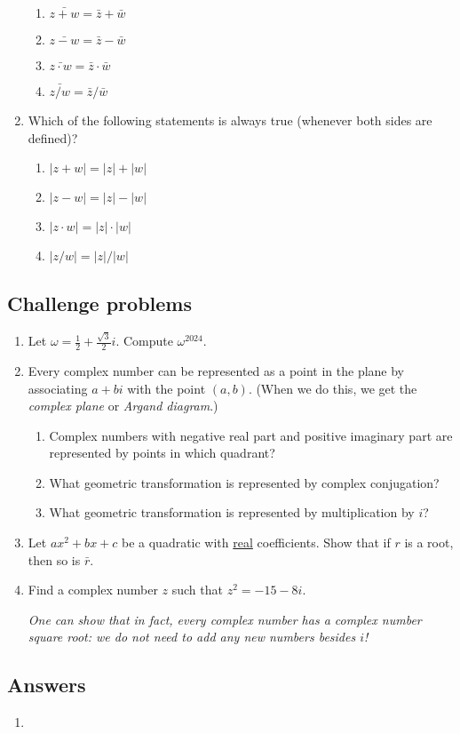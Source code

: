 \begin{enumerate}
\begin{enumerate}[label=(\Roman*)]
\item $\bar{z + w} = \bar{z} + \bar{w}$
\item $\bar{z - w} = \bar{z} - \bar{w}$
\item $\bar{z\cdot w} = \bar{z}\cdot\bar{w}$
\item $\bar{z/w} = \bar{z}/\bar{w}$
\end{enumerate}
\item Which of the following statements is always true (whenever both sides are defined)?
\begin{enumerate}[label=(\Roman*)]
\item $\lvert z + w\rvert = \lvert z\rvert + \lvert w\rvert$
\item $\lvert z - w\rvert = \lvert z\rvert - \lvert w\rvert$
\item $\lvert z\cdot w\rvert = \lvert z\rvert\cdot\lvert w\rvert$
\item $\lvert z/w\rvert = \lvert z\rvert / \lvert w\rvert$
\end{enumerate}
\end{enumerate}


\subsection{Challenge problems}

\begin{enumerate}[resume]
\item Let $\omega = \frac{1}{2} + \frac{\sqrt{3}}{2}i$. Compute $\omega^{2024}$.
\item Every complex number can be represented as a point in the plane by associating $a + bi$ with the point $(a,b)$. (When we do this, we get the \emph{complex plane} or \emph{Argand diagram}.)
\begin{enumerate}
\item Complex numbers with negative real part and positive imaginary part are represented by points in which quadrant?
\item What geometric transformation is represented by complex conjugation?
\item What geometric transformation is represented by multiplication by $i$?
\end{enumerate}
\item Let $ax^2 + bx + c$ be a quadratic with \underline{real} coefficients. Show that if $r$ is a root, then so is $\bar{r}$.
\item Find a complex number $z$ such that $z^2 = -15 - 8i$.\par
\emph{One can show that in fact, every complex number has a complex number square root: we do not need to add any new numbers besides $i$!}
\end{enumerate}


\subsection{Answers}

\begin{enumerate}
\item 
\end{enumerate}